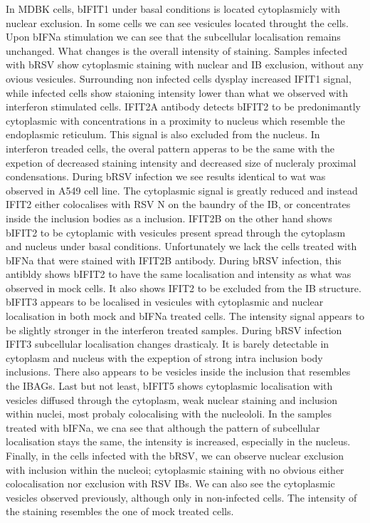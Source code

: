 In MDBK cells, bIFIT1 under basal conditions is located cytoplasmicly with nuclear exclusion. In some cells we can see vesicules located throught the cells. Upon bIFNa stimulation we can see that the subcellular localisation remains unchanged. What changes is the overall intensity of staining. Samples infected with bRSV show cytoplasmic staining with nuclear and IB exclusion, without any ovious vesicules. Surrounding non infected cells dysplay increased IFIT1 signal, while infected cells show staioning intensity lower than what we observed with interferon stimulated cells. IFIT2A antibody detects bIFIT2 to be predonimantly cytoplasmic with concentrations in a proximity to nucleus which resemble the endoplasmic reticulum. This signal is also excluded from the nucleus. In interferon treaded cells, the overal pattern apperas to be the same with the expetion of decreased staining intensity and decreased size of nucleraly proximal condensations. During bRSV infection we see results identical to wat was observed in A549 cell line. The cytoplasmic signal is greatly reduced and instead IFIT2 either colocalises with RSV N on the baundry of the IB, or concentrates inside the inclusion bodies as a inclusion. IFIT2B on the other hand shows bIFIT2 to be cytoplamic with vesicules present spread through the cytoplasm and nucleus under basal conditions. Unfortunately we lack the cells treated with bIFNa that were stained with IFIT2B antibody. During bRSV infection, this antibldy shows bIFIT2 to have the same localisation and intensity as what was observed in mock cells. It also shows IFIT2 to be excluded from the IB structure. bIFIT3 appears to be localised in vesicules with cytoplasmic and nuclear localisation in both mock and bIFNa treated cells. The intensity signal appears to be slightly stronger in the interferon treated samples. During bRSV infection IFIT3 subcellular localisation changes drasticaly. It is barely detectable in cytoplasm and nucleus with the expeption of strong intra inclusion body inclusions. There also appears to be vesicles inside the inclusion that resembles the IBAGs. Last but not least, bIFIT5 shows cytoplasmic localisation with vesicles diffused through the cytoplasm, weak nuclear staining and inclusion within nuclei, most probaly colocalising with the nucleololi. In the samples treated with bIFNa, we cna see that although the pattern of subcellular localisation stays the same, the intensity is increased, especially in the nucleus. Finally, in the cells infected with the bRSV, we can observe nuclear exclusion with inclusion within the nucleoi; cytoplasmic staining with no obvious either colocalisation nor exclusion with RSV IBs. We can also see the cytoplasmic vesicles observed previously, although only in non-infected cells. The intensity of the staining resembles the one of mock treated cells.

